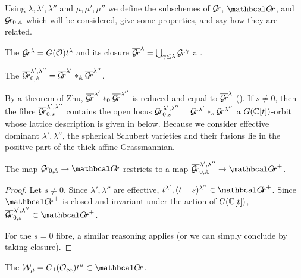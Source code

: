 \documentclass{article}
\begin{document}
Using $\lambda,\lambda',\lambda''$ and $\mu,\mu',\mu''$ we define the subschemes of $\mathcal{G}\!r$, $\Grth$, and ${\mathcal{G}\!r_{0,\mathbb A}}$ which will be considered, give some properties, and say how they are related.  
% 
\begin{definition}
\label{def:sphschub}
    The  $\mathcal{G}\!r^\lambda = G(\mathcal O) t^\lambda$ and its closure 
    $ \overline{\mathcal{G}\!r}^\lambda = \bigcup_{\gamma \le \lambda} \mathcal{G}\!r^{\gamma} $ 
    a .  
\end{definition}
% 
\begin{definition}
\label{def:sphfus}
    The  $\overline{\mathcal{G}\!r}^{\lambda', \lambda''}_{0, \mathbb A} = \overline{\mathcal{G}\!r}^{\lambda'} \ast_{\mathbb A} \overline{\mathcal{G}\!r}^{\lambda''} $.
\end{definition}
% 
By a theorem of Zhu, $ \overline{\mathcal{G}\!r}^{\lambda'} \ast_{0} \overline{\mathcal{G}\!r}^{\lambda''} $ is reduced and equal to $ \overline{\mathcal{G}\!r}^{\lambda}$ (\cite[Proposition 3.1.14]{zhu2016introduction}).
If $s\ne0$, then the fibre $\overline{\mathcal{G}\!r}_{0,s}^{\lambda', \lambda''}$ contains the open locus $ \mathcal{G}\!r_{0,s}^{\lambda', \lambda''} =  \mathcal{G}\!r^{\lambda'} \ast_{s} \mathcal{G}\!r^{\lambda''} $ a $ G(\mathbb C[t])$-orbit whose lattice description is given in  below.
% 
Because we consider effective dominant $\lambda',\lambda''$, the spherical Schubert varieties and their fusions lie in the positive part of the thick affine Grassmannian.
% 
\begin{lemma}
\label{le:sphfusispos}
    The map $ \Gr_{0, \AA} \rightarrow \Grth$ restricts to a map $ \overline{\Gr}^{\lambda', \lambda''}_{0, \AA} \rightarrow \Grth^+$.
\end{lemma}
\begin{proof}
    Let $ s \ne 0 $. Since $ \lambda', \lambda'' $ are effective, $ t^{\lambda'}, (t-s)^{\lambda''} \in \Grth^+ $.  Since $\Grth^+$ is closed and invariant under the action of $ G(\mathbb C[t])$,  $ \overline{\Gr}_{0,s}^{\lambda', \lambda''} \subset \Grth^+$.
    
    For the $ s = 0$ fibre, a similar reasoning applies (or we can simply conclude by taking closure).
\end{proof}
% 
\begin{definition}
\label{def:klslice}
    The  $\cW_\mu = G_1(\Oinf) t^\mu \subset \Grth $.
\end{definition}
% 
\end{document}
